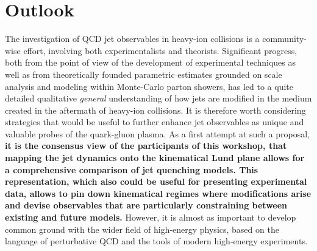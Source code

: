 
\section{Outlook}
\label{sec:outlook}

The investigation of QCD jet observables in heavy-ion collisions is a community-wise effort, involving both experimentalists and theorists. 
Significant progress, both from the point of view of the development of experimental techniques as well as from theoretically founded parametric estimates grounded on scale analysis and modeling within Monte-Carlo parton showers, has led to a quite detailed qualitative \textsl{general} understanding of how jets are modified in the medium created in the aftermath of heavy-ion collisions.
It is therefore worth considering 
strategies that would be useful to further enhance jet observables as unique and valuable probes of the quark-gluon plasma.
As a first attempt at such a proposal, 
\textbf{it is the consensus view of the participants of this workshop, that mapping the jet dynamics onto the kinematical Lund plane allows for a comprehensive comparison of jet quenching models.
This representation, which also could be useful for presenting experimental data, allows to pin down kinematical regimes where modifications arise and devise observables that are particularly constraining between existing and future models.}
However, it is almost as important to develop common ground with the wider field of high-energy physics, based on the language of perturbative QCD and the tools of modern high-energy experiments.


